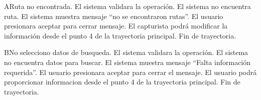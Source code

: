\begin{UCtrayectoriaA}{A}{Ruta no encontrada.}
	\UCpaso El sistema validara la operación.
	\UCpaso	El sistema no encuentra ruta.
	\UCpaso	El sistema muestra mensaje “no se encontraron rutas”.
	\UCpaso	El usuario presionara aceptar para cerrar mensaje.
	\UCpaso	El capturista podrá modificar la información desde el punto 4 de la trayectoria principal.
	\UCpaso	Fin de trayectoria.
\end{UCtrayectoriaA}

\begin{UCtrayectoriaA}{B}{No selecciono datos de busqueda.}
	\UCpaso El sistema validara la operación.
	\UCpaso	El sistema no encuentra datos para buscar.
	\UCpaso	El sistema muestra mensaje “Falta información requerida”.
	\UCpaso	El usuario presionara aceptar para cerrar el mensaje.
	\UCpaso	El usuario podrá proporcionar informacion desde el  punto 4 de la trayectoria principal.
	\UCpaso	Fin de trayectoria.
\end{UCtrayectoriaA}



		
